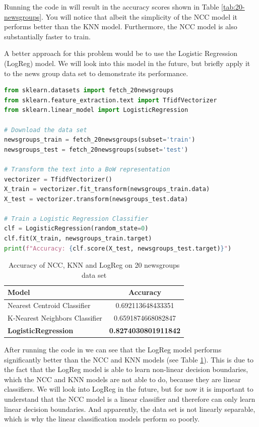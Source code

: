 Running the code in  will result in the accuracy scores shown in Table \ref{tab:20-newsgroups}.
You will notice that albeit the simplicity of the NCC model it performs better than the KNN model. Furthermore, the NCC model is also substantially faster to train.

A better approach for this problem would be to use the Logistic Regression (LogReg) model. We will look into this model in the future, but briefly apply it to the news group data set to demonstrate its performance.

\begin{lstlisting}[language=Python, caption={20 newsgroups example with Logistic Regression}, label={code:20-newsgroups-lr}]
from sklearn.datasets import fetch_20newsgroups
from sklearn.feature_extraction.text import TfidfVectorizer
from sklearn.linear_model import LogisticRegression

# Download the data set
newsgroups_train = fetch_20newsgroups(subset='train')
newsgroups_test = fetch_20newsgroups(subset='test')

# Transform the text into a BoW representation
vectorizer = TfidfVectorizer()
X_train = vectorizer.fit_transform(newsgroups_train.data)
X_test = vectorizer.transform(newsgroups_test.data)

# Train a Logistic Regression Classifier
clf = LogisticRegression(random_state=0)
clf.fit(X_train, newsgroups_train.target)
print(f"Accuracy: {clf.score(X_test, newsgroups_test.target)}")
\end{lstlisting}
\begin{table}[h]
  \centering
  \begin{tabular}{|l|c|}
    \hline
    \textbf{Model} & \textbf{Accuracy} \\
    \hline
    Nearest Centroid Classifier & 0.692113648433351\\
    K-Nearest Neighbors Classifier & 0.6591874668082847\\
    \textbf{LogisticRegression} & \textbf{0.8274030801911842}\\
    \hline
  \end{tabular}
  \caption{Accuracy of NCC, KNN and LogReg on 20 newsgroups data set}
  \label{tab:20-newsgroups-extended}
\end{table}
After running the code in  we can see that the LogReg model performs significantly better than the NCC and KNN models (see Table \ref{tab:20-newsgroups-extended}).
This is due to the fact that the LogReg model is able to learn non-linear decision boundaries, which the NCC and KNN models are not able to do, because they are linear classifiers.
We will look into LogReg in the future, but for now it is important to understand that the NCC model is a linear classifier and therefore can only learn linear decision boundaries.
And apparently, the data set is not linearly separable, which is why the linear classification models perform so poorly.

